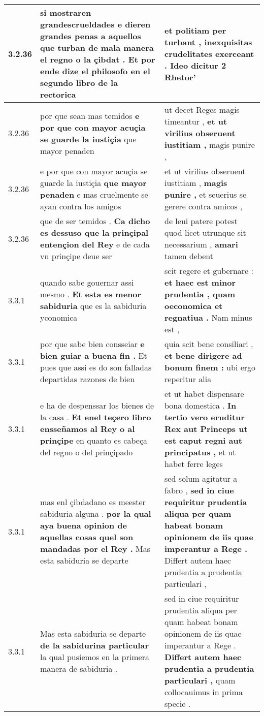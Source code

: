 \begin{tabular}{|p{1cm}|p{6.5cm}|p{6.5cm}|}
3.2.36 & si mostraren grandescrueldades \textbf{ e dieren grandes penas a aquellos que turban de mala manera el regno o la çibdat . } Et por ende dize el philosofo en el segundo libro de la rectorica & et politiam per turbant , \textbf{ inexquisitas crudelitates exerceant . } Ideo dicitur 2 Rhetor’ \\\hline
3.2.36 & por que sean mas temidos \textbf{ e por que con mayor acuçia se guarde la iustiçia } que mayor penaden & ut decet Reges magis timeantur , \textbf{ et ut virilius obseruent iustitiam , } magis punire , \\\hline
3.2.36 & e por que con mayor acuçia se guarde la iustiçia \textbf{ que mayor penaden } e mas cruelmente se ayan contra los amigos & et ut virilius obseruent iustitiam , \textbf{ magis punire , } et seuerius se gerere contra amicos , \\\hline
3.2.36 & que de ser temidos . \textbf{ Ca dicho es dessuso que la prinçipal entençion del Rey } e de cada vn prinçipe deue ser & de leui patere potest quod licet utrunque sit necessarium , \textbf{ amari } tamen debent \\\hline
3.3.1 & quando sabe gouernar assi mesmo . \textbf{ Et esta es menor sabiduria } que es la sabiduria yconomica & scit regere et gubernare : \textbf{ et haec est minor prudentia , quam oeconomica et regnatiua . } Nam minus est , \\\hline
3.3.1 & por que sabe bien consseiar \textbf{ e bien guiar a buena fin . } Et pues que assi es do son falladas departidas razones de bien & quia scit bene consiliari , \textbf{ et bene dirigere ad bonum finem : } ubi ergo reperitur alia \\\hline
3.3.1 & e ha de despenssar los bienes de la casa . \textbf{ Et enel teçero libro ensseñamos al Rey o al prinçipe } en quanto es cabeça del regno o del prinçipado & et ut habet dispensare bona domestica . \textbf{ In tertio vero eruditur Rex aut Princeps ut est caput regni aut principatus , } et ut habet ferre leges \\\hline
3.3.1 & mas enl çibdadano es meester sabiduria alguna . \textbf{ por la qual aya buena opinion de aquellas cosas quel son mandadas por el Rey . } Mas esta sabiduria se departe & sed solum agitatur a fabro , \textbf{ sed in ciue requiritur prudentia aliqua per quam habeat bonam opinionem de iis quae imperantur a Rege . } Differt autem haec prudentia a prudentia particulari , \\\hline
3.3.1 & Mas esta sabiduria se departe \textbf{ de la sabidurina particular } la qual pusiemos en la primera manera de sabiduria . & sed in ciue requiritur prudentia aliqua per quam habeat bonam opinionem de iis quae imperantur a Rege . \textbf{ Differt autem haec prudentia a prudentia particulari , } quam collocauimus in prima specie . \\\hline

\end{tabular}
